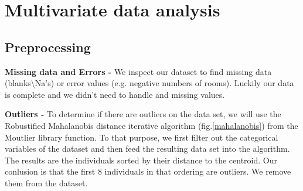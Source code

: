 \section{Multivariate data analysis}

\subsection{Preprocessing}

\textbf{Missing data and Errors - } We inspect our dataset to find missing data (blanks\textbackslash Na's) or error values (e.g. negative numbers of rooms). Luckily our data is complete and we didn't need to handle and missing values.

\textbf{Outliers - } To determine if there are outliers on the data set, we will use the Robustified Mahalanobis distance  iterative algorithm (fig.\ref{mahalanobis}) from the Moutlier library function. To that purpose, we first filter out the categorical variables of the dataset and then feed the resulting data set into the algorithm. The results are the individuals sorted by their distance to the centroid. Our conlusion is that the first 8 individuals in that ordering are outliers. We remove them from the dataset.



